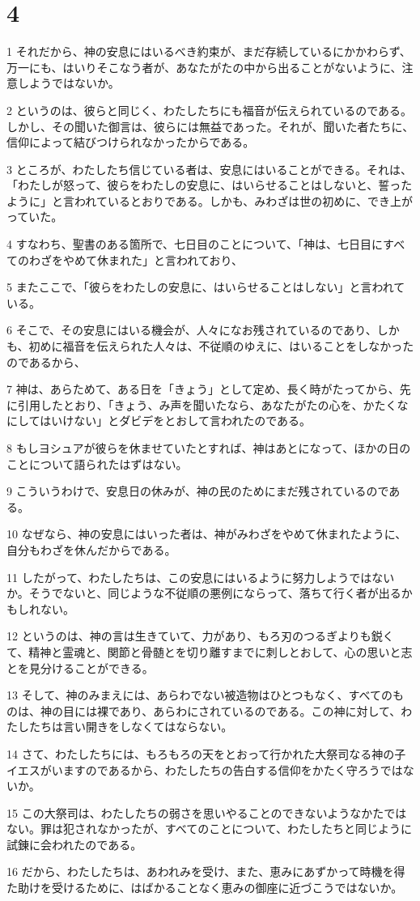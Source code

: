 \chapter{4}

\par 1 それだから、神の安息にはいるべき約束が、まだ存続しているにかかわらず、万一にも、はいりそこなう者が、あなたがたの中から出ることがないように、注意しようではないか。
\par 2 というのは、彼らと同じく、わたしたちにも福音が伝えられているのである。しかし、その聞いた御言は、彼らには無益であった。それが、聞いた者たちに、信仰によって結びつけられなかったからである。
\par 3 ところが、わたしたち信じている者は、安息にはいることができる。それは、「わたしが怒って、彼らをわたしの安息に、はいらせることはしないと、誓ったように」と言われているとおりである。しかも、みわざは世の初めに、でき上がっていた。
\par 4 すなわち、聖書のある箇所で、七日目のことについて、「神は、七日目にすべてのわざをやめて休まれた」と言われており、
\par 5 またここで、「彼らをわたしの安息に、はいらせることはしない」と言われている。
\par 6 そこで、その安息にはいる機会が、人々になお残されているのであり、しかも、初めに福音を伝えられた人々は、不従順のゆえに、はいることをしなかったのであるから、
\par 7 神は、あらためて、ある日を「きょう」として定め、長く時がたってから、先に引用したとおり、「きょう、み声を聞いたなら、あなたがたの心を、かたくなにしてはいけない」とダビデをとおして言われたのである。
\par 8 もしヨシュアが彼らを休ませていたとすれば、神はあとになって、ほかの日のことについて語られたはずはない。
\par 9 こういうわけで、安息日の休みが、神の民のためにまだ残されているのである。
\par 10 なぜなら、神の安息にはいった者は、神がみわざをやめて休まれたように、自分もわざを休んだからである。
\par 11 したがって、わたしたちは、この安息にはいるように努力しようではないか。そうでないと、同じような不従順の悪例にならって、落ちて行く者が出るかもしれない。
\par 12 というのは、神の言は生きていて、力があり、もろ刃のつるぎよりも鋭くて、精神と霊魂と、関節と骨髄とを切り離すまでに刺しとおして、心の思いと志とを見分けることができる。
\par 13 そして、神のみまえには、あらわでない被造物はひとつもなく、すべてのものは、神の目には裸であり、あらわにされているのである。この神に対して、わたしたちは言い開きをしなくてはならない。
\par 14 さて、わたしたちには、もろもろの天をとおって行かれた大祭司なる神の子イエスがいますのであるから、わたしたちの告白する信仰をかたく守ろうではないか。
\par 15 この大祭司は、わたしたちの弱さを思いやることのできないようなかたではない。罪は犯されなかったが、すべてのことについて、わたしたちと同じように試錬に会われたのである。
\par 16 だから、わたしたちは、あわれみを受け、また、恵みにあずかって時機を得た助けを受けるために、はばかることなく恵みの御座に近づこうではないか。

